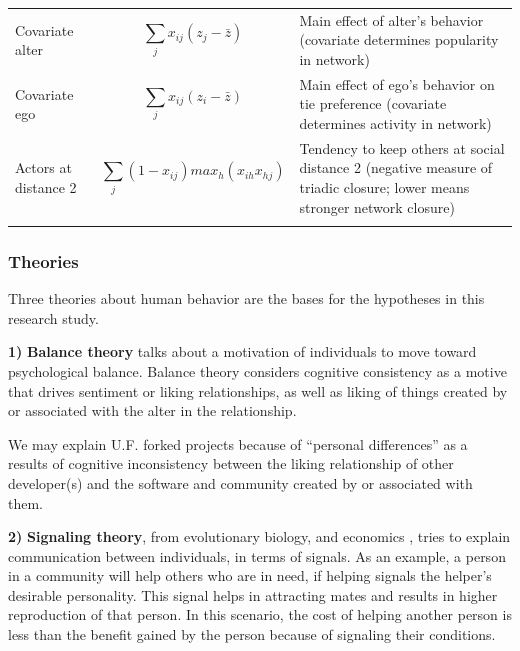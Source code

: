 \documentclass{acm_proc_article-sp}
\begin{document}
\begin{table}[!ht]
\begin{tabular}{m{} m{} m{}}
Covariate alter & \begin{equation*} \sum_j x_{ij} (z_j - \bar z) \end{equation*} & Main effect of alter's behavior (covariate determines popularity in network) \\ 
Covariate ego & \begin{equation*} \sum_j x_{ij} (z_i - \bar z) \end{equation*} & Main effect of ego's behavior on tie preference (covariate determines activity in network) \\
Actors at distance 2 & \begin{equation*} \sum_j (1 - x_{ij}) max_h (x_{ih}x_{hj}) \end{equation*} & Tendency to keep others at social distance 2 (negative measure of triadic closure; lower means stronger network closure) \\ 
\noalign{\smallskip}\hline
\end{tabular}
\end{table}

\subsubsection{Theories}
Three theories about human behavior are the bases for the hypotheses in this research study.

\textbf{1)} \textbf{Balance theory} \cite{Heider} talks about a motivation of individuals to move toward psychological balance. Balance theory considers cognitive consistency as a motive that drives sentiment or liking relationships, as well as liking of things created by or associated with the alter in the relationship.

We may explain U.F. forked projects because of ``personal differences'' as a results of cognitive inconsistency between the liking relationship of other developer(s) and the software and community created by or associated with them. 

\textbf{2)} \textbf{Signaling theory}, from evolutionary biology, and economics \cite{Spence}, tries to explain communication between individuals, in terms of signals. As an example, a person in a community will help others who are in need, if helping signals the helper's desirable personality. This signal helps in attracting mates and results in higher reproduction of that person. In this scenario, the cost of helping another person is less than the benefit gained by the person because of signaling their conditions. 
\end{document}
